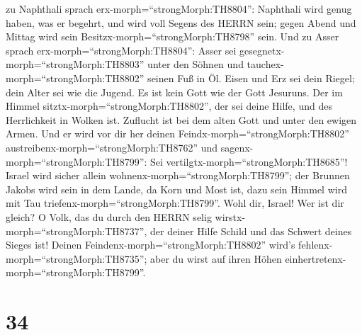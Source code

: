 zu Naphthali sprach erx-morph=``strongMorph:TH8804'': Naphthali wird
genug haben, was er begehrt, und wird voll Segens des HERRN sein; gegen
Abend und Mittag wird sein Besitzx-morph=``strongMorph:TH8798'' sein.
 Und zu Asser sprach erx-morph=``strongMorph:TH8804'':
Asser sei gesegnetx-morph=``strongMorph:TH8803'' unter den Söhnen und
tauchex-morph=``strongMorph:TH8802'' seinen Fuß in Öl. 
Eisen und Erz sei dein Riegel; dein Alter sei wie die Jugend.
 Es ist kein Gott wie der Gott Jesuruns. Der im Himmel
sitztx-morph=``strongMorph:TH8802'', der sei deine Hilfe, und des
Herrlichkeit in Wolken ist.  Zuflucht ist bei dem alten
Gott und unter den ewigen Armen. Und er wird vor dir her deinen
Feindx-morph=``strongMorph:TH8802''
austreibenx-morph=``strongMorph:TH8762'' und
sagenx-morph=``strongMorph:TH8799'': Sei
vertilgtx-morph=``strongMorph:TH8685''!  Israel wird sicher
allein wohnenx-morph=``strongMorph:TH8799''; der Brunnen Jakobs wird
sein in dem Lande, da Korn und Most ist, dazu sein Himmel wird mit Tau
triefenx-morph=``strongMorph:TH8799''.  Wohl dir, Israel!
Wer ist dir gleich? O Volk, das du durch den HERRN selig
wirstx-morph=``strongMorph:TH8737'', der deiner Hilfe Schild und das
Schwert deines Sieges ist! Deinen Feindenx-morph=``strongMorph:TH8802''
wird's fehlenx-morph=``strongMorph:TH8735''; aber du wirst auf ihren
Höhen einhertretenx-morph=``strongMorph:TH8799''.

\hypertarget{section-33}{%
\section{34}\label{section-33}}

